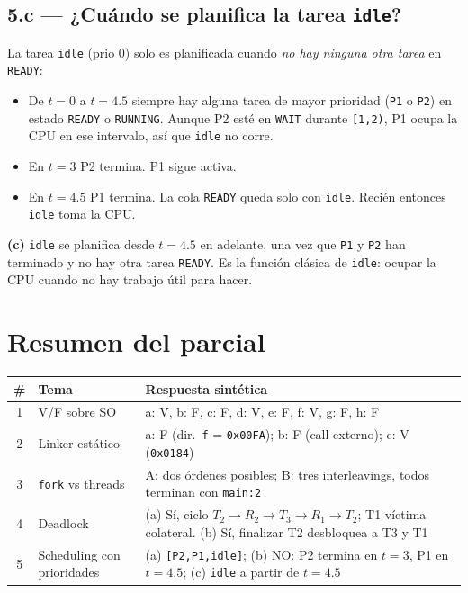 \documentclass[11pt,a4paper]{article}
\begin{document}
\subsection*{5.c --- ¿Cuándo se planifica la tarea \texttt{idle}?}

La tarea \texttt{idle} (prio 0) solo es planificada cuando \emph{no
hay ninguna otra tarea} en \texttt{READY}:

\begin{itemize}[leftmargin=*,nosep]
    \item De $t=0$ a $t=4.5$ siempre hay alguna tarea de mayor
        prioridad (\texttt{P1} o \texttt{P2}) en estado
        \texttt{READY} o \texttt{RUNNING}. Aunque P2 esté en
        \texttt{WAIT} durante \texttt{[1,2)}, P1 ocupa la CPU en ese
        intervalo, así que \texttt{idle} no corre.
    \item En $t=3$ P2 termina. P1 sigue activa.
    \item En $t=4.5$ P1 termina. La cola \texttt{READY} queda solo
        con \texttt{idle}. Recién entonces \texttt{idle} toma la CPU.
\end{itemize}

\begin{respuesta}
\textbf{(c)} \texttt{idle} se planifica desde $t = 4.5$ en adelante,
una vez que \texttt{P1} y \texttt{P2} han terminado y no hay otra
tarea \texttt{READY}. Es la función clásica de \texttt{idle}:
ocupar la CPU cuando no hay trabajo útil para hacer.
\end{respuesta}

\section*{Resumen del parcial}

\begin{center}
\small
\begin{tabular}{@{}clp{8cm}@{}}
\toprule
\# & Tema & Respuesta sintética \\
\midrule
1 & V/F sobre SO    & a: V, b: F, c: F, d: V, e: F, f: V, g: F, h: F \\
2 & Linker estático & a: F (dir.\ \texttt{f} = \texttt{0x00FA}); b: F (call externo); c: V (\texttt{0x0184}) \\
3 & \texttt{fork} vs threads & A: dos órdenes posibles; B: tres interleavings, todos terminan con \texttt{main:2} \\
4 & Deadlock        & (a) Sí, ciclo $T_2 \to R_2 \to T_3 \to R_1 \to T_2$; T1 víctima colateral. (b) Sí, finalizar T2 desbloquea a T3 y T1 \\
5 & Scheduling con prioridades & (a) \texttt{[P2,P1,idle]}; (b) NO: P2 termina en $t=3$, P1 en $t=4.5$; (c) \texttt{idle} a partir de $t=4.5$ \\
\bottomrule
\end{tabular}
\end{center}
\end{document}
